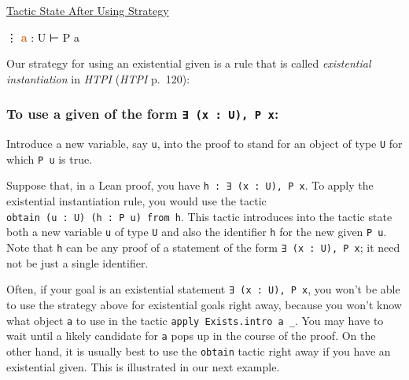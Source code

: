 \documentclass[
  letterpaper,
  DIV=11,
  numbers=noendperiod]{scrreprt}
\newenvironment{Shaded}{\begin{snugshade}}{\end{snugshade}}
\newcommand{\InformationTok}[1]{\textcolor[rgb]{0.37,0.37,0.37}{#1}}
\newcommand{\NormalTok}[1]{\textcolor[rgb]{0.00,0.23,0.31}{#1}}
\newcommand{\SpecialCharTok}[1]{\textcolor[rgb]{0.37,0.37,0.37}{#1}}
\renewcommand{\NormalTok}[1]{\textcolor[HTML]{000000}{#1}}
\renewcommand{\SpecialCharTok}[1]{}
\renewcommand{\InformationTok}[1]{\textcolor[HTML]{D2691E}{\textbf{#1}}}
\newenvironment{ind}
	{\begin{list}{}{\setlength{\leftmargin}{1em}}\item\relax}
	{\end{list}}
\newcommand{\nobreakShaded}{\renewenvironment{Shaded}
	{\begin{tcolorbox}[frame hidden, enhanced, interior hidden, boxrule=0pt,
		borderline west={3pt}{0pt}{shadecolor}, sharp corners]}
	{\end{tcolorbox}}}
\newenvironment{aft}
	{\nobreakShaded\begin{minipage}[t]{0.475\textwidth}
		\uline{Tactic State After Using Strategy}}
	{\end{minipage}}
\theoremstyle{remark}
\begin{document}
\begin{aft}

\begin{Shaded}
\begin{Highlighting}[]
\SpecialCharTok{\textgreater{}\textgreater{}}\NormalTok{ ⋮}
\InformationTok{a }\NormalTok{: U}
\NormalTok{⊢ P a}
\end{Highlighting}
\end{Shaded}

\end{aft}

Our strategy for using an existential given is a rule that is called
\emph{existential instantiation} in \emph{HTPI} (\emph{HTPI} p.~120):

\hypertarget{to-use-a-given-of-the-form-x-u-p-x-1}{%
\subsubsection{\texorpdfstring{To use a given of the form
\texttt{∃\ (x\ :\ U),\ P\ x}:}{To use a given of the form ∃ (x : U), P x:}}\label{to-use-a-given-of-the-form-x-u-p-x-1}}

\begin{ind}
Introduce a new variable, say \texttt{u}, into the proof to stand for an
object of type \texttt{U} for which \texttt{P\ u} is true.

\end{ind}

Suppose that, in a Lean proof, you have
\texttt{h\ :\ ∃\ (x\ :\ U),\ P\ x}. To apply the existential
instantiation rule, you would use the tactic
\texttt{obtain\ (u\ :\ U)\ (h\textquotesingle{}\ :\ P\ u)\ from\ h}.
This tactic introduces into the tactic state both a new variable
\texttt{u} of type \texttt{U} and also the identifier
\texttt{h\textquotesingle{}} for the new given \texttt{P\ u}. Note that
\texttt{h} can be any proof of a statement of the form
\texttt{∃\ (x\ :\ U),\ P\ x}; it need not be just a single identifier.

Often, if your goal is an existential statement
\texttt{∃\ (x\ :\ U),\ P\ x}, you won't be able to use the strategy
above for existential goals right away, because you won't know what
object \texttt{a} to use in the tactic
\texttt{apply\ Exists.intro\ a\ \_}. You may have to wait until a likely
candidate for \texttt{a} pops up in the course of the proof. On the
other hand, it is usually best to use the \texttt{obtain} tactic right
away if you have an existential given. This is illustrated in our next
example.
\end{document}

